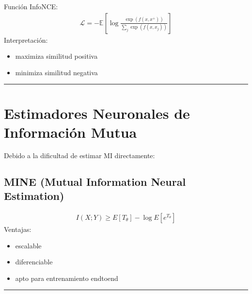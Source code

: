 \documentclass[letterpaper,10pt,english]{jupyterBook}
\begin{document}
\sphinxAtStartPar
Función InfoNCE:
\begin{equation*}
\begin{split}
\mathcal{L} =
-\mathbb{E}
\left[
\log
\frac{\exp(f(x,x^+))}
{\sum_j \exp(f(x,x_j))}
\right]
\end{split}
\end{equation*}
\sphinxAtStartPar
Interpretación:
\begin{itemize}
\item {} 
\sphinxAtStartPar
maximiza similitud positiva

\item {} 
\sphinxAtStartPar
minimiza similitud negativa

\end{itemize}


\bigskip\hrule\bigskip



\section{Estimadores Neuronales de Información Mutua}
\label{\detokenize{04_data_science_applications/deep_learning_mi:estimadores-neuronales-de-informacion-mutua}}
\sphinxAtStartPar
Debido a la dificultad de estimar MI directamente:


\subsection{MINE (Mutual Information Neural Estimation)}
\label{\detokenize{04_data_science_applications/deep_learning_mi:mine-mutual-information-neural-estimation}}\begin{equation*}
\begin{split}
I(X;Y) \ge
E[T_\theta] -
\log E[e^{T_\theta}]
\end{split}
\end{equation*}
\sphinxAtStartPar
Ventajas:
\begin{itemize}
\item {} 
\sphinxAtStartPar
escalable

\item {} 
\sphinxAtStartPar
diferenciable

\item {} 
\sphinxAtStartPar
apto para entrenamiento end\sphinxhyphen{}to\sphinxhyphen{}end

\end{itemize}


\bigskip\hrule\bigskip
\end{document}
